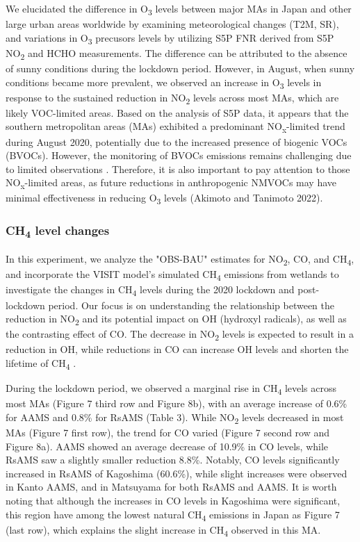 We elucidated the difference in O\textsubscript{3} levels between major MAs in Japan and other large urban areas worldwide by examining meteorological changes (T2M, SR), and variations in O\textsubscript{3} precusors levels by utilizing S5P FNR derived from S5P NO\textsubscript{2} and HCHO measurements. The difference can be attributed to the absence of sunny conditions during the lockdown period. However, in August, when sunny conditions became more prevalent, we observed an increase in O\textsubscript{3} levels in response to the sustained reduction in NO\textsubscript{2} levels across most MAs, which are likely VOC-limited areas. Based on the analysis of S5P data, it appears that the southern metropolitan areas (MAs) exhibited a predominant NO\textsubscript{x}-limited trend during August 2020, potentially due to the increased presence of biogenic VOCs (BVOCs). However, the monitoring of BVOCs emissions remains challenging due to limited observations \citep{tani2021exchanges,ito2021terrestrial}. Therefore, it is also important to pay attention to those NO\textsubscript{x}-limited areas, as future reductions in anthropogenic NMVOCs may have minimal effectiveness in reducing O\textsubscript{3} levels (Akimoto and Tanimoto 2022). \par

\subsubsection*{CH\textsubscript{4} level changes}
In this experiment, we analyze the "OBS-BAU" estimates for NO\textsubscript{2}, CO, and CH\textsubscript{4}, and incorporate the VISIT model's simulated CH\textsubscript{4} emissions from wetlands to investigate the changes in CH\textsubscript{4} levels during the 2020 lockdown and post-lockdown period. Our focus is on understanding the relationship between the reduction in NO\textsubscript{2} and its potential impact on OH (hydroxyl radicals), as well as the contrasting effect of CO. The decrease in NO\textsubscript{2} levels is expected to result in a reduction in OH, while reductions in CO can increase OH levels and shorten the lifetime of CH\textsubscript{4} \citep{akimoto2022rethinking}.\par
During the lockdown period, we observed a marginal rise in CH\textsubscript{4} levels across most MAs (Figure 7 third row and Figure 8b), with an average increase of 0.6\% for AAMS and 0.8\% for RsAMS (Table 3). While NO\textsubscript{2} levels decreased in most MAs (Figure 7 first row), the trend for CO varied (Figure 7 second row and Figure 8a). AAMS showed an average decrease of 10.9\% in CO levels, while RsAMS saw a slightly smaller reduction 8.8\%. Notably, CO levels significantly increased in RsAMS of Kagoshima (60.6\%), while slight increases were observed in Kanto AAMS, and in Matsuyama for both RsAMS and AAMS. It is worth noting that although the increases in CO levels in Kagoshima were significant, this region have among the lowest natural CH\textsubscript{4} emissions in Japan as Figure 7 (last row), which explains the slight increase in CH\textsubscript{4} observed in this MA.\par


